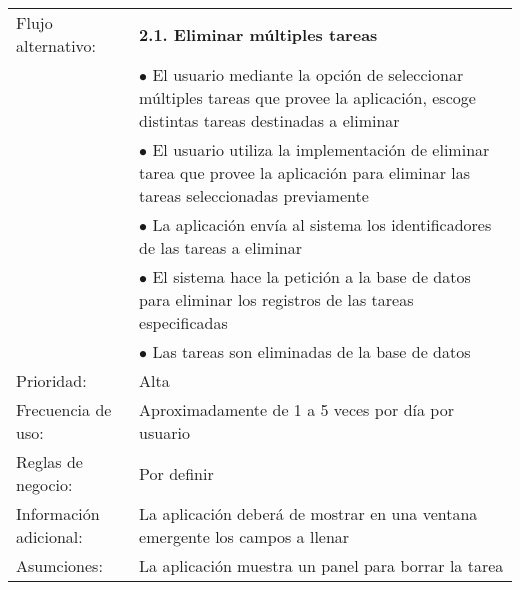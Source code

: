 \begin{center}
\begin{tabular}{p{3cm}p{5cm}p{4cm}p{2cm}}
  \hline
  Flujo alternativo: & \multicolumn{3}{p{11cm}}{\textbf{2.1. Eliminar m\'ultiples tareas}}\\
	       & \multicolumn{3}{p{11cm}}{$\bullet$ El usuario mediante la opci\'on de seleccionar m\'ultiples tareas que provee la aplicaci\'on, escoge distintas tareas destinadas a eliminar}\\
	       & \multicolumn{3}{p{11cm}}{$\bullet$ El usuario utiliza la implementaci\'on de eliminar tarea que provee la aplicaci\'on para eliminar las tareas seleccionadas previamente}\\
	       & \multicolumn{3}{p{11cm}}{$\bullet$ La aplicaci\'on env\'ia al sistema los identificadores de las tareas a eliminar}\\
	       & \multicolumn{3}{p{11cm}}{$\bullet$ El sistema hace la petici\'on a la base de datos para eliminar los registros de las tareas especificadas}\\
	       & \multicolumn{3}{p{11cm}}{$\bullet$ Las tareas son eliminadas de la base de datos}\\
  \hline
  Prioridad: & \multicolumn{3}{p{11cm}}{Alta}\\
  \hline
  Frecuencia de uso: & \multicolumn{3}{p{11cm}}{Aproximadamente de 1 a 5 veces por d\'ia por usuario}\\
  \hline
  Reglas de negocio: & \multicolumn{3}{p{11cm}}{Por definir}\\
  \hline
  Informaci\'on adicional: & \multicolumn{3}{p{11cm}}{La aplicaci\'on deber\'a de mostrar en una ventana emergente los campos a llenar}\\
  \hline
  Asumciones: & \multicolumn{3}{p{11cm}}{La aplicaci\'on muestra un panel para borrar la tarea}\\
  \hline
\end{tabular}
\end{center}
